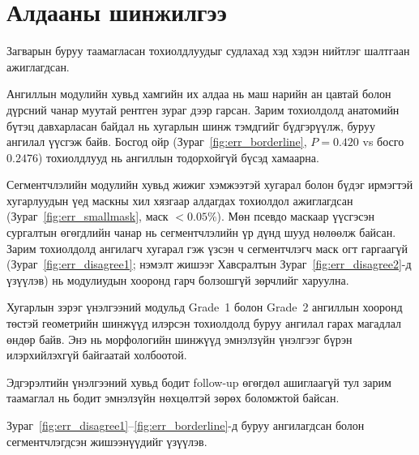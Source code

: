 \section{Алдааны шинжилгээ}

Загварын буруу таамагласан тохиолдлуудыг судлахад хэд хэдэн нийтлэг шалтгаан ажиглагдсан.

Ангиллын модулийн хувьд хамгийн их алдаа нь маш нарийн ан цавтай болон дүрсний чанар муутай рентген зураг дээр гарсан. Зарим тохиолдолд анатомийн бүтэц давхарласан байдал нь хугарлын шинж тэмдгийг бүдгэрүүлж, буруу ангилал үүсгэж байв. Босгод ойр (Зураг~\ref{fig:err_borderline}, $P=0.420$ vs босго $0.2476$) тохиолдлууд нь ангиллын тодорхойгүй бүсэд хамаарна.

Сегментчлэлийн модулийн хувьд жижиг хэмжээтэй хугарал болон бүдэг ирмэгтэй хугарлуудын үед маскны хил хязгаар алдагдах тохиолдол ажиглагдсан (Зураг~\ref{fig:err_smallmask}, маск $<0.05\%$). Мөн псевдо маскаар үүсгэсэн сургалтын өгөгдлийн чанар нь сегментчлэлийн үр дүнд шууд нөлөөлж байсан. Зарим тохиолдолд ангилагч хугарал гэж үзсэн ч сегментчлэгч маск огт гаргаагүй (Зураг~\ref{fig:err_disagree1}; нэмэлт жишээг Хавсралтын Зураг~\ref{fig:err_disagree2}-д үзүүлэв) нь модулиудын хооронд гарч болзошгүй зөрчлийг харуулна.

Хугарлын зэрэг үнэлгээний модульд Grade~1 болон Grade~2 ангиллын хооронд төстэй геометрийн шинжүүд илэрсэн тохиолдолд буруу ангилал гарах магадлал өндөр байв. Энэ нь морфологийн шинжүүд эмнэлзүйн үнэлгээг бүрэн илэрхийлэхгүй байгаатай холбоотой.

Эдгэрэлтийн үнэлгээний хувьд бодит follow-up өгөгдөл ашиглаагүй тул зарим таамаглал нь бодит эмнэлзүйн нөхцөлтэй зөрөх боломжтой байсан.

Зураг~\ref{fig:err_disagree1}--\ref{fig:err_borderline}-д буруу ангилагдсан болон сегментчлэгдсэн жишээнүүдийг үзүүлэв.

